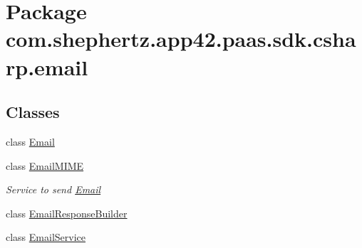 \hypertarget{namespacecom_1_1shephertz_1_1app42_1_1paas_1_1sdk_1_1csharp_1_1email}{\section{Package com.\+shephertz.\+app42.\+paas.\+sdk.\+csharp.\+email}
\label{namespacecom_1_1shephertz_1_1app42_1_1paas_1_1sdk_1_1csharp_1_1email}
}
\subsection*{Classes}
\begin{DoxyCompactItemize}
\item 
class \hyperlink{classcom_1_1shephertz_1_1app42_1_1paas_1_1sdk_1_1csharp_1_1email_1_1_email}{Email}
\item 
class \hyperlink{classcom_1_1shephertz_1_1app42_1_1paas_1_1sdk_1_1csharp_1_1email_1_1_email_m_i_m_e}{Email\+M\+I\+M\+E}
\begin{DoxyCompactList}\small\item\em Service to send \hyperlink{classcom_1_1shephertz_1_1app42_1_1paas_1_1sdk_1_1csharp_1_1email_1_1_email}{Email} \end{DoxyCompactList}\item 
class \hyperlink{classcom_1_1shephertz_1_1app42_1_1paas_1_1sdk_1_1csharp_1_1email_1_1_email_response_builder}{Email\+Response\+Builder}
\item 
class \hyperlink{classcom_1_1shephertz_1_1app42_1_1paas_1_1sdk_1_1csharp_1_1email_1_1_email_service}{Email\+Service}
\end{DoxyCompactItemize}
